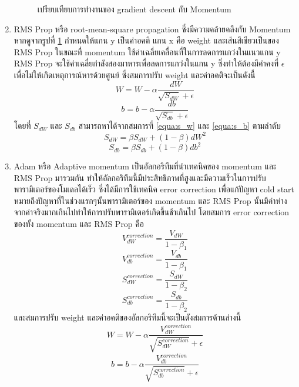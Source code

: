 \begin{enumerate}
\begin{figure}[!ht]
			\caption{เปรียบเทียบการทำงานของ gradient descent กับ Momentum}
			\label{fig:momentum_explain}
	\end{figure} 
	\item RMS Prop หรือ root-mean-square propagation ซึ่งมีความคล้ายคลึงกับ Momentum หากดูจากรูปที่ \ref{fig:momentum_explain} กำหนดให้แกน y เป็นค่าอคติ แกน x คือ weight
	และเส้นสีเขียวเป็นของ RMS Prop ในขณะที่ momentum ใช้ค่าเฉลี่ยเคลื่อนที่ในการลดการแกว่งในแนวแกน y RMS Prop จะใช้ค่าเฉลี่ยกำลังสองมาหารเพื่อลดการแกว่งในแกน y ซึ่งทำให้ต้องมีค่าคงที่ $\epsilon$
	เพื่อไม่ให้เกิดเหตุการณ์หารด้วยศูนย์ ซึ่งสมการปรับ weight และค่าอคติจะเป็นดังนี้
	\begin{equation}
		W = W - \alpha \frac{dW}{\sqrt{S_{dW}} + \epsilon}
	\end{equation}
	\begin{equation}
		b = b - \alpha \frac{db}{\sqrt{S_{db}} + \epsilon}
	\end{equation}
	โดยที่ $S_{dW}$ และ $S_{db}$ สามารถหาได้จากสมการที่ \ref{equa:s_w} และ \ref{equa:s_b} ตามลำดับ
	\begin{equation}
		S_{dW} = \beta S_{dW} + (1 - \beta) dW^2
		\label{equa:s_w}
	\end{equation}\begin{equation}
		S_{db} = \beta S_{db} + (1 - \beta) db^2
		\label{equa:s_b}
	\end{equation}
	\item Adam หรือ Adaptive momentum เป็นอัลกอริทึมที่นำเทคนิคของ momentum และ RMS Prop มารวมกัน ทำให้อัลกอริทึมนี้มีประสิทธิภาพที่สูงและมีความเร็วในการปรับพารามิเตอร์ของโมเดลได้เร็ว 
	ซึ่งได้มีการใช้เทคนิค error correction เพื่อแก้ปัญหา cold start หมายถึงปัญหาที่ในช่วงแรกๆนั้นพารามิเตอร์ของ momentum และ RMS Prop นั้นมีค่าห่างจากค่าจริงมากเกินไปทำให้การปรับพารามิเตอร์เกิดขึ้นช้าเกินไป
	โดยสมการ error correction ของทั้ง momentum และ RMS Prop คือ
	\begin{equation}
		V^{correction}_{dW} = \frac{V_{dW}}{1 - \beta_1}
	\end{equation}
	\begin{equation}
		V^{correction}_{db} = \frac{V_{db}}{1 - \beta_1}
	\end{equation}
	\begin{equation}
		S^{correction}_{dW} = \frac{S_{dW}}{1 - \beta_2}
	\end{equation}
	\begin{equation}
		S^{correction}_{db} = \frac{S_{db}}{1 - \beta_2}
	\end{equation}
	และสมการปรับ weight และค่าอคติของอัลกอริทึมนี้จะเป็นดังสมการด้านล่างนี้ 
	\begin{equation}
		W = W - \alpha \frac{V^{correction}_{dW}}{\sqrt{S^{correction}_{dW}} + \epsilon}
	\end{equation}
	\begin{equation}
		b = b - \alpha \frac{V^{correction}_{db}}{\sqrt{S^{correction}_{db}} + \epsilon}
	\end{equation}
\end{enumerate}